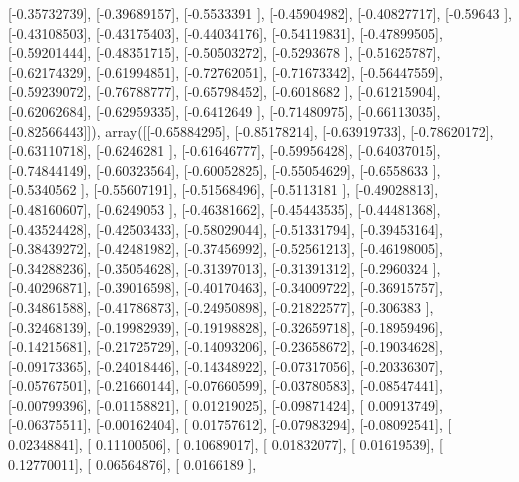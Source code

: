 \documentclass{article}
\begin{document}
       [-0.35732739],
       [-0.39689157],
       [-0.5533391 ],
       [-0.45904982],
       [-0.40827717],
       [-0.59643   ],
       [-0.43108503],
       [-0.43175403],
       [-0.44034176],
       [-0.54119831],
       [-0.47899505],
       [-0.59201444],
       [-0.48351715],
       [-0.50503272],
       [-0.5293678 ],
       [-0.51625787],
       [-0.62174329],
       [-0.61994851],
       [-0.72762051],
       [-0.71673342],
       [-0.56447559],
       [-0.59239072],
       [-0.76788777],
       [-0.65798452],
       [-0.6018682 ],
       [-0.61215904],
       [-0.62062684],
       [-0.62959335],
       [-0.6412649 ],
       [-0.71480975],
       [-0.66113035],
       [-0.82566443]]), array([[-0.65884295],
       [-0.85178214],
       [-0.63919733],
       [-0.78620172],
       [-0.63110718],
       [-0.6246281 ],
       [-0.61646777],
       [-0.59956428],
       [-0.64037015],
       [-0.74844149],
       [-0.60323564],
       [-0.60052825],
       [-0.55054629],
       [-0.6558633 ],
       [-0.5340562 ],
       [-0.55607191],
       [-0.51568496],
       [-0.5113181 ],
       [-0.49028813],
       [-0.48160607],
       [-0.6249053 ],
       [-0.46381662],
       [-0.45443535],
       [-0.44481368],
       [-0.43524428],
       [-0.42503433],
       [-0.58029044],
       [-0.51331794],
       [-0.39453164],
       [-0.38439272],
       [-0.42481982],
       [-0.37456992],
       [-0.52561213],
       [-0.46198005],
       [-0.34288236],
       [-0.35054628],
       [-0.31397013],
       [-0.31391312],
       [-0.2960324 ],
       [-0.40296871],
       [-0.39016598],
       [-0.40170463],
       [-0.34009722],
       [-0.36915757],
       [-0.34861588],
       [-0.41786873],
       [-0.24950898],
       [-0.21822577],
       [-0.306383  ],
       [-0.32468139],
       [-0.19982939],
       [-0.19198828],
       [-0.32659718],
       [-0.18959496],
       [-0.14215681],
       [-0.21725729],
       [-0.14093206],
       [-0.23658672],
       [-0.19034628],
       [-0.09173365],
       [-0.24018446],
       [-0.14348922],
       [-0.07317056],
       [-0.20336307],
       [-0.05767501],
       [-0.21660144],
       [-0.07660599],
       [-0.03780583],
       [-0.08547441],
       [-0.00799396],
       [-0.01158821],
       [ 0.01219025],
       [-0.09871424],
       [ 0.00913749],
       [-0.06375511],
       [-0.00162404],
       [ 0.01757612],
       [-0.07983294],
       [-0.08092541],
       [ 0.02348841],
       [ 0.11100506],
       [ 0.10689017],
       [ 0.01832077],
       [ 0.01619539],
       [ 0.12770011],
       [ 0.06564876],
       [ 0.0166189 ],
\end{document}
